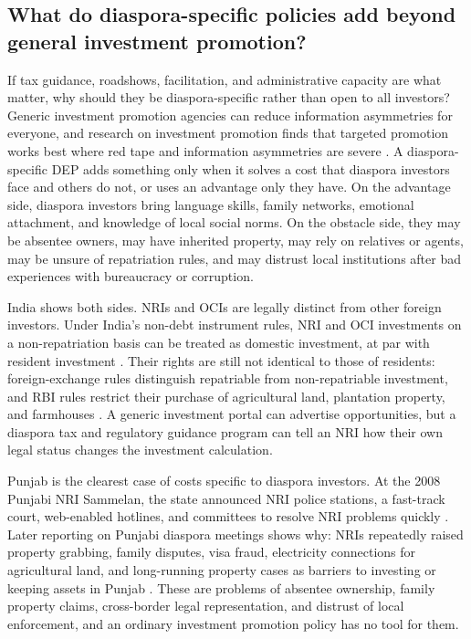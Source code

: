 \documentclass[12pt]{article}
\let\oldsubsection\subsection
\renewcommand{\subsection}{\FloatBarrier\oldsubsection}
\begin{document}
\subsection{What do diaspora-specific policies add beyond general investment promotion?}

If tax guidance, roadshows, facilitation, and administrative capacity are what matter, why should they be diaspora-specific rather than open to all investors? Generic investment promotion agencies can reduce information asymmetries for everyone, and research on investment promotion finds that targeted promotion works best where red tape and information asymmetries are severe \citep{harding_roll_2011}. A diaspora-specific DEP adds something only when it solves a cost that diaspora investors face and others do not, or uses an advantage only they have. On the advantage side, diaspora investors bring language skills, family networks, emotional attachment, and knowledge of local social norms. On the obstacle side, they may be absentee owners, may have inherited property, may rely on relatives or agents, may be unsure of repatriation rules, and may distrust local institutions after bad experiences with bureaucracy or corruption.

India shows both sides. NRIs and OCIs are legally distinct from other foreign investors. Under India's non-debt instrument rules, NRI and OCI investments on a non-repatriation basis can be treated as domestic investment, at par with resident investment \citep{unctad_india_nodate}. Their rights are still not identical to those of residents: foreign-exchange rules distinguish repatriable from non-repatriable investment, and RBI rules restrict their purchase of agricultural land, plantation property, and farmhouses \citep{reserve_bank_of_india_reserve_nodate}. A generic investment portal can advertise opportunities, but a diaspora tax and regulatory guidance program can tell an NRI how their own legal status changes the investment calculation.

Punjab is the clearest case of costs specific to diaspora investors. At the 2008 Punjabi NRI Sammelan, the state announced NRI police stations, a fast-track court, web-enabled hotlines, and committees to resolve NRI problems quickly \citep{jalandhar_punjab_india_special_nodate}. Later reporting on Punjabi diaspora meetings shows why: NRIs repeatedly raised property grabbing, family disputes, visa fraud, electricity connections for agricultural land, and long-running property cases as barriers to investing or keeping assets in Punjab \citep{pti_punjabi_2022}. These are problems of absentee ownership, family property claims, cross-border legal representation, and distrust of local enforcement, and an ordinary investment promotion policy has no tool for them.
\end{document}
